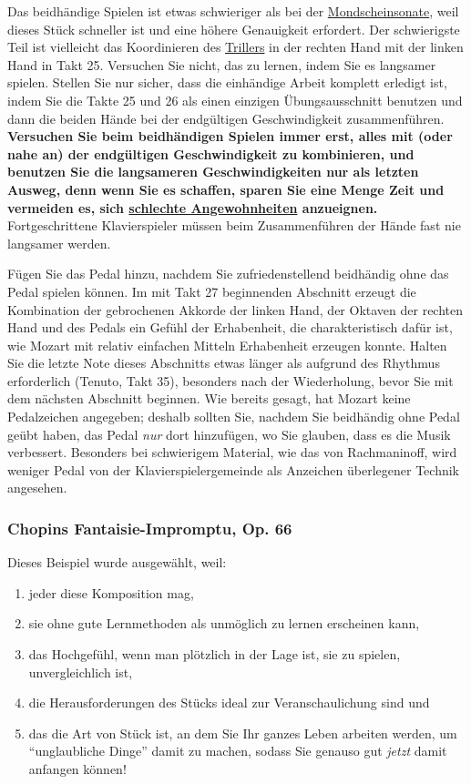 Das beidhändige Spielen ist etwas schwieriger als bei der \hyperref[c1ii25b]{Mondscheinsonate}, weil dieses Stück schneller ist und eine höhere Genauigkeit erfordert.
Der schwierigste Teil ist vielleicht das Koordinieren des \hyperref[c1iii3]{Trillers} in der rechten Hand mit der linken Hand in Takt 25.
Versuchen Sie nicht, das zu lernen, indem Sie es langsamer spielen.
Stellen Sie nur sicher, dass die einhändige Arbeit komplett erledigt ist, indem Sie die Takte 25 und 26 als einen einzigen Übungsausschnitt benutzen und dann die beiden Hände bei der endgültigen Geschwindigkeit zusammenführen.
\textbf{Versuchen Sie beim beidhändigen Spielen immer erst, alles mit (oder nahe an) der endgültigen Geschwindigkeit zu kombinieren, 
und benutzen Sie die langsameren Geschwindigkeiten nur als letzten Ausweg, denn wenn Sie es schaffen, sparen Sie eine Menge Zeit und vermeiden es, sich \hyperref[c1ii22]{schlechte Angewohnheiten} anzueignen.}
Fortgeschrittene Klavierspieler müssen beim Zusammenführen der Hände fast nie langsamer werden.

Fügen Sie das Pedal hinzu, nachdem Sie zufriedenstellend beidhändig ohne das Pedal spielen können.
Im mit Takt 27 beginnenden Abschnitt erzeugt die Kombination der gebrochenen Akkorde der linken Hand, der Oktaven der rechten Hand und des Pedals ein Gefühl der Erhabenheit, die charakteristisch dafür ist, wie Mozart mit relativ einfachen Mitteln Erhabenheit erzeugen konnte.
Halten Sie die letzte Note dieses Abschnitts etwas länger als aufgrund des Rhythmus erforderlich (Tenuto, Takt 35), besonders nach der Wiederholung, bevor Sie mit dem nächsten Abschnitt beginnen.
Wie bereits gesagt, hat Mozart keine Pedalzeichen angegeben; deshalb sollten Sie, nachdem Sie beidhändig ohne Pedal geübt haben, das Pedal \textit{nur} dort hinzufügen, wo Sie glauben, dass es die Musik verbessert.
Besonders bei schwierigem Material, wie das von Rachmaninoff, wird weniger Pedal von der Klavierspielergemeinde als Anzeichen überlegener Technik angesehen.


\label{FI}
\subsubsection{Chopins Fantaisie-Impromptu, Op. 66}
\label{c1ii25d}

Dieses Beispiel wurde ausgewählt, weil:

\begin{enumerate}[label={\arabic*.}] 
 \item jeder diese Komposition mag,
 \item sie ohne gute Lernmethoden als unmöglich zu lernen erscheinen kann,
 \item das Hochgefühl, wenn man plötzlich in der Lage ist, sie zu spielen, unvergleichlich ist,
 \item die Herausforderungen des Stücks ideal zur Veranschaulichung sind und
 \item das die Art von Stück ist, an dem Sie Ihr ganzes Leben arbeiten werden, um \enquote{unglaubliche Dinge} damit zu machen, sodass Sie genauso gut \textit{jetzt} damit anfangen können!
\end{enumerate}

